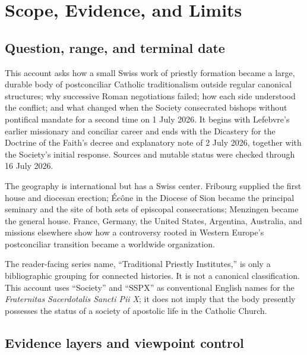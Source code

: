 \section{Scope, Evidence, and Limits}

\subsection{Question, range, and terminal date}

This account asks how a small Swiss work of priestly formation became a large, durable body of postconciliar Catholic traditionalism outside regular canonical structures; why successive Roman negotiations failed; how each side understood the conflict; and what changed when the Society consecrated bishops without pontifical mandate for a second time on 1 July 2026. It begins with Lefebvre's earlier missionary and conciliar career and ends with the Dicastery for the Doctrine of the Faith's decree and explanatory note of 2 July 2026, together with the Society's initial response. Sources and mutable status were checked through 16 July 2026.

The geography is international but has a Swiss center. Fribourg supplied the first house and diocesan erection; Écône in the Diocese of Sion became the principal seminary and the site of both sets of episcopal consecrations; Menzingen became the general house. France, Germany, the United States, Argentina, Australia, and missions elsewhere show how a controversy rooted in Western Europe's postconciliar transition became a worldwide organization.

The reader-facing series name, ``Traditional Priestly Institutes,'' is only a bibliographic grouping for connected histories. It is not a canonical classification. This account uses ``Society'' and ``SSPX'' as conventional English names for the \emph{Fraternitas Sacerdotalis Sancti Pii X}; it does not imply that the body presently possesses the status of a society of apostolic life in the Catholic Church.

\subsection{Evidence layers and viewpoint control}

